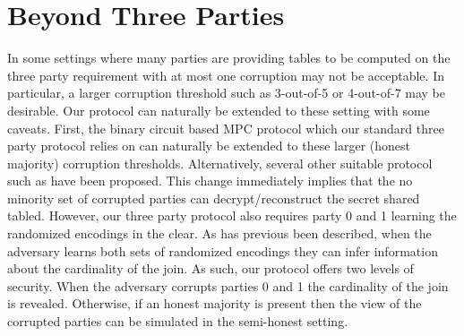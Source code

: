 \section{Beyond Three Parties}

In some settings where many parties are providing tables to be computed on the three party requirement with at most one corruption may not be acceptable. In particular, a larger corruption threshold such as 3-out-of-5 or 4-out-of-7 may be desirable. Our protocol can naturally be extended to these setting with some caveats. First, the binary circuit based MPC protocol\cite{highthroughput} which our standard three party protocol relies on can naturally be extended to these larger (honest majority) corruption thresholds. Alternatively, several other suitable protocol such as\cite{DBLP:conf/crypto/ChidaGHIKLN18} have been proposed. This change immediately implies that the no minority set of corrupted parties can decrypt/reconstruct the secret shared tabled. However, our three party protocol also requires party 0 and 1 learning the randomized encodings in the clear.  As has previous been described, when the adversary learns both sets of randomized encodings they can infer information about the cardinality of the join. As such, our protocol offers two levels of security. When the adversary corrupts parties 0 and 1 the cardinality of the join is revealed. Otherwise, if an honest majority is present then the view of the corrupted parties can be simulated in the semi-honest setting. 



